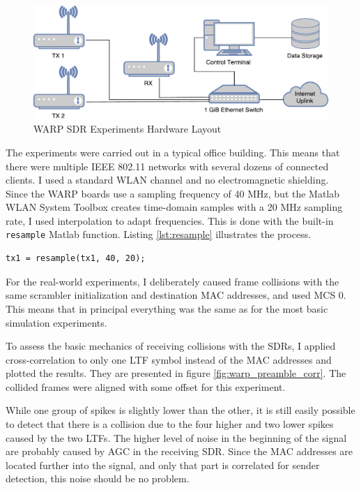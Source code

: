 \begin{figure}[H]
	\centering
	\includegraphics[width=\textwidth]{gfx/images/warp-layout}
	\caption{WARP SDR Experiments Hardware Layout}
	\label{fig:warp-layout}
\end{figure}

The experiments were carried out in a typical office building. This means that there were multiple IEEE 802.11 networks with several dozens of connected clients. I used a standard WLAN channel and no electromagnetic shielding.\\

Since the \gls{WARP} boards use a sampling frequency of 40 MHz, but the Matlab WLAN System Toolbox creates time-domain samples with a 20 MHz sampling rate, I used interpolation to adapt frequencies. This is done with the built-in \texttt{resample} Matlab function. Listing \ref{lst:resample} illustrates the process.

\begin{lstlisting}[captionpos=b,caption={Interpolate Sampling Rate},label=lst:resample]
% Interpolate to get from 20 to 40 MHz sampling rate
tx1 = resample(tx1, 40, 20);
\end{lstlisting}

For the real-world experiments, I deliberately caused frame collisions with the same scrambler initialization and destination \gls{MAC} addresses, and used \gls{MCS} 0. This means that in principal everything was the same as for the most basic simulation experiments.

To assess the basic mechanics of receiving collisions with the \glspl{SDR}, I applied cross-correlation to only one \gls{LTF} symbol instead of the \gls{MAC} addresses and plotted the results. They are presented in figure \ref{fig:warp_preamble_corr}. The collided frames were aligned with some offset for this experiment.

While one group of spikes is slightly lower than the other, it is still easily possible to detect that there is a collision due to the four higher and two lower spikes caused by the two \glspl{LTF}. The higher level of noise in the beginning of the signal are probably caused by \gls{AGC} in the receiving \gls{SDR}. Since the \gls{MAC} addresses are located further into the signal, and only that part is correlated for sender detection, this noise should be no problem.

